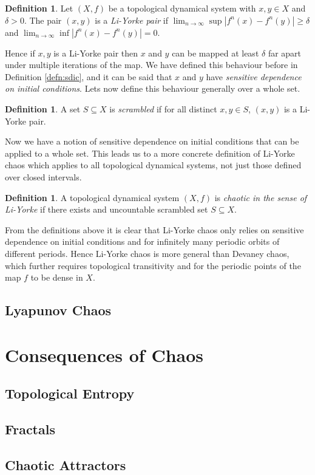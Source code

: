 \documentclass[11pt,a4paper,oneside]{memoir}
\theoremstyle{plain}
\theoremstyle{definition}
\newtheorem{defn}[thm]{Definition}
\begin{document}
\begin{defn}
    Let $(X, f)$ be a topological dynamical system with $x, y \in X$ and $\delta > 0$. The pair $(x, y)$ is a \emph{Li-Yorke pair} if $\lim_{n \to \infty}\sup \left\lvert f^n(x) - f^n(y) \right\rvert \geq \delta$ and $\lim_{n\to\infty}\inf \left\lvert f^n(x) - f^n(y) \right\rvert = 0$.
\end{defn}
Hence if $x, y$ is a Li-Yorke pair then $x$ and $y$ can be mapped at least $\delta$ far apart under multiple iterations of the map. We have defined this behaviour before in Definition \ref{defn:sdic}, and it can be said that $x$ and $y$ have \emph{sensitive dependence on initial conditions}. Lets now define this behaviour generally over a whole set.

\begin{defn}
    A set $S \subseteq X$ is \emph{scrambled} if for all distinct $x, y \in S$, $(x, y)$ is a Li-Yorke pair.
\end{defn}

Now we have a notion of sensitive dependence on initial conditions that can be applied to a whole set. This leads us to a more concrete definition of Li-Yorke chaos which applies to all topological dynamical systems, not just those defined over closed intervals.

\begin{defn}
    A topological dynamical system $(X, f)$ is \emph{chaotic in the sense of Li-Yorke} if there exists and uncountable scrambled set $S \subseteq X$.
\end{defn}

From the definitions above it is clear that Li-Yorke chaos only relies on sensitive dependence on initial conditions and for infinitely many periodic orbits of different periods. Hence Li-Yorke chaos is more general than Devaney chaos, which further requires topological transitivity and for the periodic points of the map $f$ to be dense in $X$.

\section{Lyapunov Chaos}

\chapter{Consequences of Chaos}

\section{Topological Entropy}

\section{Fractals}

\section{Chaotic Attractors}



\end{document}
